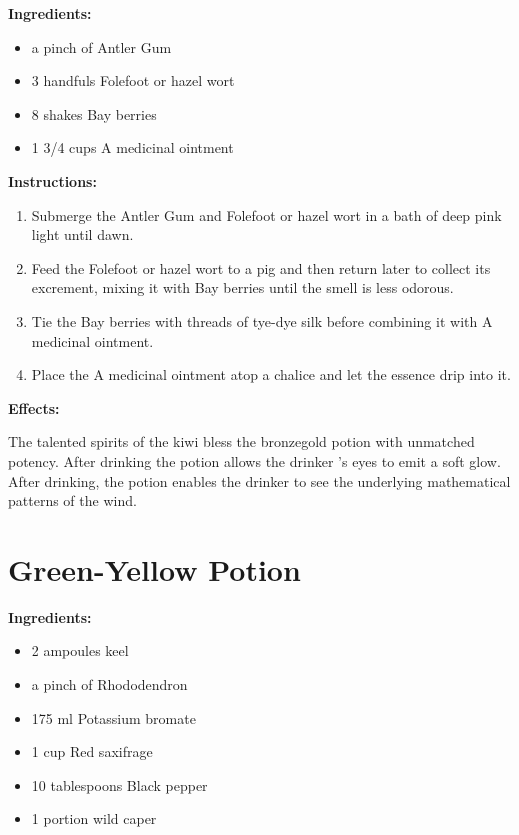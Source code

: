 \documentclass{article}
\begin{document}
\textbf{Ingredients:}

\begin{itemize}
  \item a pinch of Antler Gum
  \item 3 handfuls Folefoot or hazel wort
  \item 8 shakes Bay berries
  \item 1 3/4 cups A medicinal ointment
\end{itemize}

\textbf{Instructions:}

\begin{enumerate}
  \item Submerge the Antler Gum and Folefoot or hazel wort in a bath of deep pink light until dawn.
  \item Feed the Folefoot or hazel wort to a pig and then return later to collect its excrement, mixing it with Bay berries until the smell is less odorous.
  \item Tie the Bay berries with threads of tye-dye silk before combining it with A medicinal ointment.
  \item Place the A medicinal ointment atop a chalice and let the essence drip into it.
\end{enumerate}

\textbf{Effects:}

The talented spirits of the kiwi bless the bronzegold potion with unmatched potency. After drinking the potion allows the drinker 's eyes to emit a soft glow. After drinking, the potion enables the drinker to see the underlying mathematical patterns of the wind.

\newpage
\section*{Green-Yellow Potion}

\textbf{Ingredients:}

\begin{itemize}
  \item 2 ampoules keel
  \item a pinch of Rhododendron
  \item 175 ml Potassium bromate
  \item 1 cup Red saxifrage
  \item 10 tablespoons Black pepper
  \item 1 portion wild caper
\end{itemize}
\end{document}
